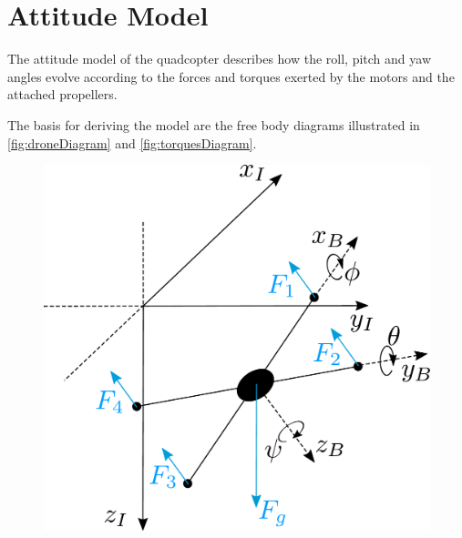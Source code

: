 \section{Attitude Model} \label{sec:AttitudeModel}
The attitude model of the quadcopter describes how the roll, pitch and yaw angles evolve according to the forces and torques exerted by the motors and the attached propellers. 

The basis for deriving the model are the free body diagrams illustrated in \autoref{fig:droneDiagram} and \ref{fig:torquesDiagram}. 
%
\begin{minipage}{\linewidth}
	\begin{minipage}{0.6\linewidth}
		\begin{figure}[H]
			\includegraphics[scale=.4]{figures/droneDiagram}
			\centering
			

\end{figure}
\end{minipage}
\end{minipage}
